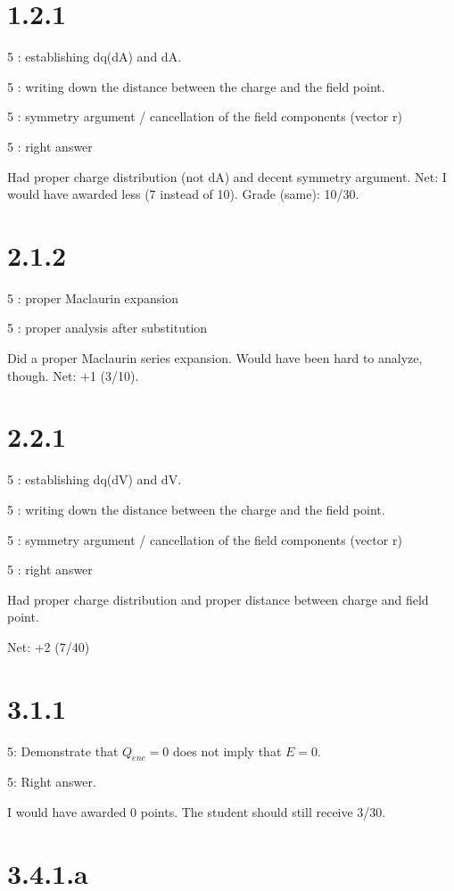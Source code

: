 \documentclass{article}
\begin{document}
\section*{1.2.1}
\label{sec:1_2_1}

5 : establishing dq(dA) and dA.

5 : writing down the distance between the charge and the field point.

5 : symmetry argument / cancellation of the field components (vector r)

5 : right answer

Had proper charge distribution (not dA) and decent symmetry argument.
Net: I would have awarded less (7 instead of 10). Grade (same): 10/30.

\section*{2.1.2}
\label{sec:2_1_2}

5 : proper Maclaurin expansion

5 : proper analysis after substitution

Did a proper Maclaurin series expansion. Would have been hard to analyze,
though.
Net: +1 (3/10).

\section*{2.2.1}
\label{sec:2_2_1}

5 : establishing dq(dV) and dV.

5 : writing down the distance between the charge and the field point.

5 : symmetry argument / cancellation of the field components (vector r)

5 : right answer

Had proper charge distribution and proper distance between charge and field
point.

Net: +2 (7/40)

\section*{3.1.1}
\label{sec:3_1_1}

5: Demonstrate that $ Q_{enc} = 0 $ does not imply that $ E = 0 $.

5: Right answer.

I would have awarded 0 points. The student should still receive 3/30.

\section*{3.4.1.a}
\label{sec:3_4_1_a}
\end{document}
